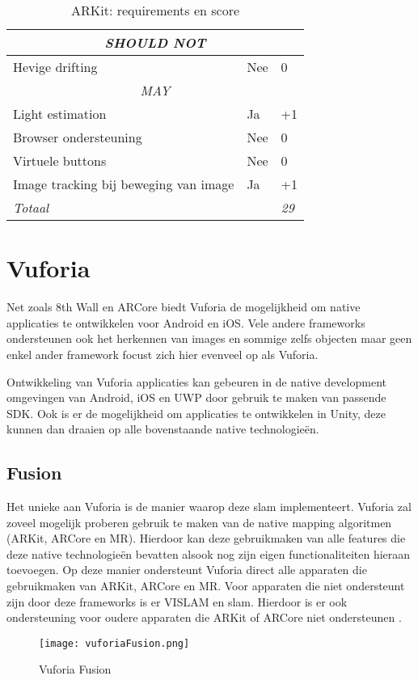 \begin{table}[]
\begin{tabular}{@{}lll@{}}
        \multicolumn{3}{c}{\textit{SHOULD NOT}}                                              \\ \midrule
        Hevige drifting                            & Nee                    & 0              \\ \midrule
        \multicolumn{3}{c}{\textit{MAY}}                                                     \\ \midrule
        Light estimation                           & Ja                     & +1             \\
        Browser ondersteuning                      & Nee                     & 0             \\
        Virtuele buttons                           & Nee                    & 0              \\
        Image tracking bij beweging van image      & Ja                     & +1             \\ \midrule
        \textit{Totaal}                            & \multicolumn{1}{r}{}   & \textit{29}    \\ \bottomrule
    \end{tabular}
    \caption{ARKit: requirements en score}
    \label{tbl:arkitreq}
\end{table}

\section{Vuforia}
Net zoals 8th Wall en ARCore biedt Vuforia de mogelijkheid om native applicaties te ontwikkelen voor Android en iOS. Vele andere frameworks ondersteunen ook het herkennen van images en sommige zelfs objecten maar geen enkel ander framework focust zich hier evenveel op als Vuforia.  

Ontwikkeling van Vuforia applicaties kan gebeuren in de native development omgevingen van Android, iOS en UWP door gebruik te maken van passende SDK. Ook is er de mogelijkheid om applicaties te ontwikkelen in Unity, deze kunnen dan draaien op alle bovenstaande native technologieën.

\subsection{Fusion}
Het unieke aan Vuforia is de manier waarop deze \acrshort{slam} implementeert. Vuforia zal zoveel mogelijk proberen gebruik te maken van de native mapping algoritmen (ARKit, ARCore en MR). Hierdoor kan deze gebruikmaken van alle features die deze native technologieën bevatten alsook nog zijn eigen functionaliteiten hieraan toevoegen. Op deze manier ondersteunt Vuforia direct alle apparaten die gebruikmaken van ARKit, ARCore en MR. Voor apparaten die niet ondersteunt zijn door deze frameworks is er VISLAM en \acrshort{slam}. Hierdoor is er ook ondersteuning voor oudere apparaten die ARKit of ARCore niet ondersteunen \autocite{VuforiaFusion}.
\begin{figure}
    \texttt{[image: vuforiaFusion.png]}
    \caption{Vuforia Fusion \autocite{VuforiaFusion}}
    \label{fig:vuforiaFusion}
\end{figure}

